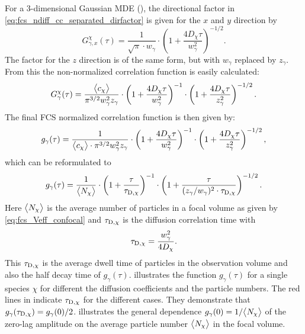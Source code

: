 For a 3-dimensional Gaussian MDE (), the directional factor in \eqref{eq:fcs_ndiff_cc_separated_dirfactor} is given for the $x$ and $y$ direction by%
\begin{equation}\label{eq:fcs_ndiff_cc_confocal_separated_factor}
  G_{\gamma,x}^{\chi}(\tau)=\frac{1}{\sqrt{\pi}\cdot w_\gamma}\cdot\left(1+\frac{4D_\chi\tau}{w_\gamma^2}\right)^{-1/2}.
\end{equation}
The factor for the $z$ direction is of the same form, but with $w_\gamma$ replaced by  $z_\gamma$.
From this the non-normalized correlation function is easily calculated:
\begin{equation}\label{eq:fcs_ndiff_cc_confocal}
  G_{\gamma}^{\chi}(\tau)=\frac{\bigl\langle c_\chi\bigr\rangle}{\pi^{3/2}w_\gamma^2 z_\gamma}\cdot\left(1+\frac{4D_\chi\tau}{w_\gamma^2}\right)^{-1}\cdot\left(1+\frac{4D_\chi\tau}{z_\gamma^2}\right)^{-1/2}.
\end{equation}
The final FCS normalized correlation function is then given by:
\begin{equation}\label{eq:fcs_ndiff_confocal}
  g_{\gamma}(\tau)=\frac{1}{\bigl\langle c_\chi\bigr\rangle\cdot\pi^{3/2}w_\gamma^2 z_\gamma}\cdot\left(1+\frac{4D_\chi\tau}{w_\gamma^2}\right)^{-1}\cdot\left(1+\frac{4D_\chi\tau}{z_\gamma^2}\right)^{-1/2},
\end{equation}
which can be reformulated to
\begin{equation}\label{eq:fcs_ndiff_confocal_NTauD}
  g_{\gamma}(\tau)=\frac{1}{\bigl\langle N_\chi\bigr\rangle}\cdot\left(1+\frac{\tau}{\tau_{{\text{D}},\chi}}\right)^{-1}\cdot\left(1+\frac{\tau}{(z_\gamma/w_\gamma)^2\cdot\tau_{{\text{D}},\chi}}\right)^{-1/2}.
\end{equation}
Here $\bigl\langle N_\chi\bigr\rangle$ is the average number of particles in a focal volume as given by \eqref{eq:fcs_Veff_confocal} and $\tau_{{\text{D}},\chi}$ is the diffusion correlation time with
\begin{equation}\label{eq:fcs_ndiff_confocal_tauD}
  \tau_{{\text{D}},\chi}=\frac{w_\gamma^2}{4D_\chi}.
\end{equation}
This $\tau_{{\text{D}},\chi}$ is the average dwell time of particles in the observation volume and also the half decay time of $g_\gamma(\tau)$.  illustrates the function $g_\gamma(\tau)$ for a single species $\chi$ for different the diffusion coefficients and the particle numbers. The red lines in  indicate $\tau_{{\text{D}},\chi}$ for the different cases. They demonstrate that $g_\gamma(\tau_{{\text{D}},\chi}) =g_\gamma(0)/2$.  illustrates the general dependence $g_\gamma(0)=1/\bigl\langle N_\chi\bigr\rangle$ of the zero-lag amplitude on the average particle number $\bigl\langle N_\chi\bigr\rangle$ in the focal volume.


